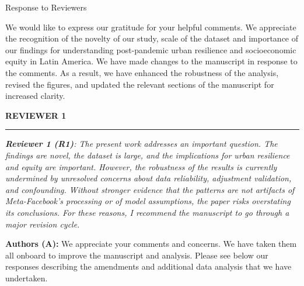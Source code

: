 \documentclass[12pt,a4paper,oneside, reqno]{amsart}
\begin{document}
\newpage

\thispagestyle{empty}


\mbox{}

\vspace{1pt}

\begin{flushright}


{\large Response to Reviewers}

\end{flushright}

\vspace{15pt}


\setlength{\leftskip}{0cm} We would like to express our gratitude for your helpful comments. We appreciate the recognition of the novelty of our study, scale of the dataset and importance of our findings for understanding post-pandemic urban resilience and socioeconomic equity in Latin America. We have made changes to the manuscript in response to the comments. As a result, we have enhanced the robustness of the analysis, revised the figures, and updated the relevant sections of the manuscript for increased clarity. 

\vspace{10pt}

\textbf{REVIEWER 1}
\vspace{-16pt}
\begin{center}
    \rule{\textwidth}{.1pt}
\end{center}

\vspace{5pt}

\setlength{\leftskip}{0cm} \textit{\textbf{Reviewer 1 (R1)}: The present work addresses an important question. The findings are novel, the dataset is large, and the implications for urban resilience and equity are important. However, the robustness of the results is currently undermined by unresolved concerns about data reliability, adjustment validation, and confounding. Without stronger evidence that the patterns are not artifacts of Meta-Facebook’s processing or of model assumptions, the paper risks overstating its conclusions. For these reasons, I recommend the manuscript to go through a major revision cycle.}

\setlength{\leftskip}{1cm}\textbf{Authors (A):} We appreciate your comments and concerns. We have taken them all onboard to improve the manuscript and analysis. Please see below our responses describing the amendments and additional data analysis that we have undertaken.
\end{document}
